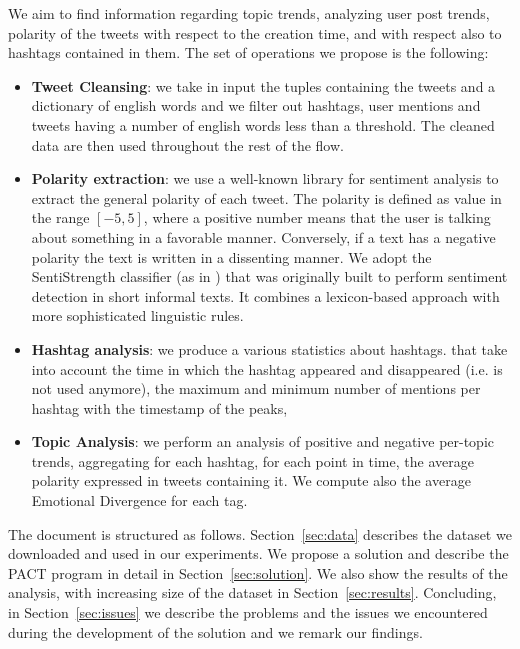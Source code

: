 We aim to find information regarding topic trends, analyzing user post trends, polarity of the tweets with respect to the creation time, and with respect also to hashtags contained in them. 
The set of operations we propose is the following:  
\begin{itemize}
\item \textbf{Tweet Cleansing}: we take in input the tuples containing the tweets and a dictionary of english words and we filter out hashtags, user mentions and tweets having a number of english words less than a threshold. The cleaned data are then used throughout the rest of the flow. 
\item \textbf{Polarity extraction}: we use a well-known library for sentiment analysis to extract the general polarity of each tweet. The polarity is defined as value in the range $[-5,5]$, where a positive number means that the user is talking about something in a favorable manner. Conversely, if a text has a negative polarity the text is written in a dissenting manner. 
We adopt the SentiStrength classifier (as in \cite{Thelwall:2010:SSS:1890706.1890713}) that was originally built to perform sentiment detection in short informal texts.
It combines a lexicon-based approach with more sophisticated linguistic rules.

\item \textbf{Hashtag analysis}: we produce a various statistics about hashtags. 
that take into account the time in which the hashtag appeared and disappeared (i.e. is not used anymore), the maximum and minimum number of mentions per hashtag with the timestamp of the peaks,  
\item \textbf{Topic Analysis}:  we perform an analysis of positive and negative per-topic trends, aggregating for each hashtag, for each point in time, the average polarity expressed in tweets containing it. 
We compute also the average Emotional Divergence\cite{DBLP:conf:icwsm:PfitznerGS12}  for each tag.
\end{itemize}

The document is structured as follows. Section~\ref{sec:data} describes the dataset we downloaded and used in our experiments. We propose a solution and describe the PACT program in detail in Section~\ref{sec:solution}. We also show the results of the analysis, with increasing size of the dataset in Section~\ref{sec:results}. Concluding, in Section~\ref{sec:issues} we describe the problems and the issues we encountered during the development of the solution and we remark our findings.
